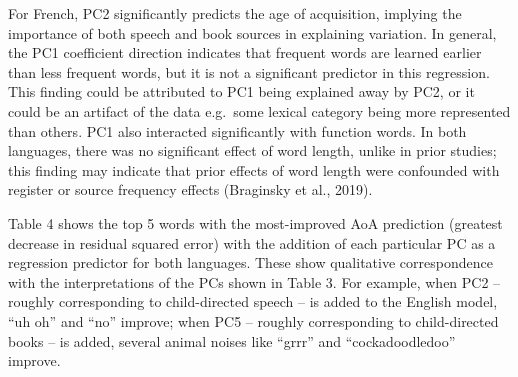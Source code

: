 \documentclass[10pt, letterpaper]{article}
\begin{document}
For French, PC2 significantly predicts the age of acquisition, implying
the importance of both speech and book sources in explaining variation.
In general, the PC1 coefficient direction indicates that frequent words
are learned earlier than less frequent words, but it is not a
significant predictor in this regression. This finding could be
attributed to PC1 being explained away by PC2, or it could be an
artifact of the data e.g.~some lexical category being more represented
than others. PC1 also interacted significantly with function words. In
both languages, there was no significant effect of word length, unlike
in prior studies; this finding may indicate that prior effects of word
length were confounded with register or source frequency effects
(Braginsky et al., 2019).

Table 4 shows the top 5 words with the most-improved AoA prediction
(greatest decrease in residual squared error) with the addition of each
particular PC as a regression predictor for both languages. These show
qualitative correspondence with the interpretations of the PCs shown in
Table 3. For example, when PC2 -- roughly corresponding to
child-directed speech -- is added to the English model, ``uh oh'' and
``no'' improve; when PC5 -- roughly corresponding to child-directed
books -- is added, several animal noises like ``grrr'' and
``cockadoodledoo'' improve.
\end{document}
